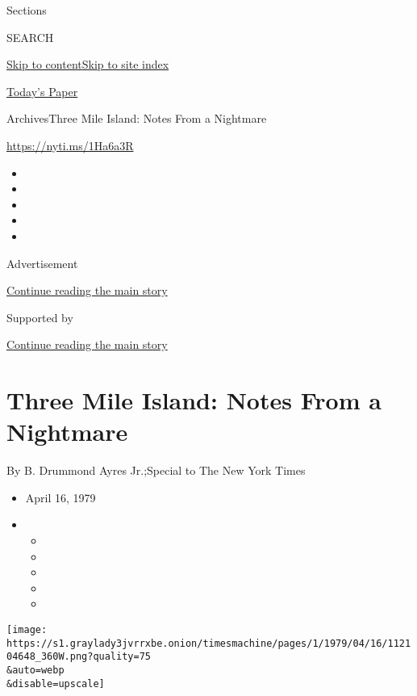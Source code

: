 Sections

SEARCH

\protect\hyperlink{site-content}{Skip to
content}\protect\hyperlink{site-index}{Skip to site index}

\href{https://myaccount.nytimes3xbfgragh.onion/auth/login?response_type=cookie\&client_id=vi}{}

\href{https://www.nytimes3xbfgragh.onion/section/todayspaper}{Today's
Paper}

Archives\textbar{}Three Mile Island: Notes From a Nightmare

\url{https://nyti.ms/1Ha6a3R}

\begin{itemize}
\item
\item
\item
\item
\item
\end{itemize}

Advertisement

\protect\hyperlink{after-top}{Continue reading the main story}

Supported by

\protect\hyperlink{after-sponsor}{Continue reading the main story}

\hypertarget{three-mile-island-notes-from-a-nightmare}{%
\section{Three Mile Island: Notes From a
Nightmare}\label{three-mile-island-notes-from-a-nightmare}}

By B. Drummond Ayres Jr.;Special to The New York Times

\begin{itemize}
\item
  April 16, 1979
\item
  \begin{itemize}
  \item
  \item
  \item
  \item
  \item
  \end{itemize}
\end{itemize}

\texttt{[image: https://s1.graylady3jvrrxbe.onion/timesmachine/pages/1/1979/04/16/112104648\_360W.png?quality=75\\\&auto=webp\\\&disable=upscale]}

